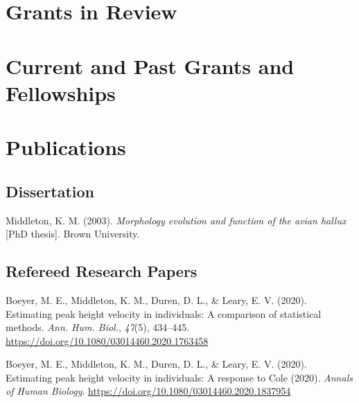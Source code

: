 \documentclass[11pt, a4paper]{awesome-cv}
\begin{document}
\hypertarget{grants-in-review}{%
\section{Grants in Review}\label{grants-in-review}}


\hypertarget{current-and-past-grants-and-fellowships}{%
\section{Current and Past Grants and
Fellowships}\label{current-and-past-grants-and-fellowships}}


\hypertarget{publications}{%
\section{Publications}\label{publications}}

\hypertarget{dissertation}{%
\subsection{Dissertation}\label{dissertation}}

\begingroup
\setlength{\parindent}{-0.5in}
\setlength{\leftskip}{0.5in}

\hypertarget{refs_dissertation}{}
\leavevmode\hypertarget{ref-middleton_morphology_2003}{}%
Middleton, K. M. (2003). \emph{Morphology evolution and function of the
avian hallux} {[}PhD thesis{]}. Brown University.

\endgroup

\hypertarget{refereed-research-papers}{%
\subsection{Refereed Research Papers}\label{refereed-research-papers}}

\begingroup
\setlength{\parindent}{-0.5in}
\setlength{\leftskip}{0.5in}

\hypertarget{refs_papers}{}
\leavevmode\hypertarget{ref-Boeyer2020-jn}{}%
Boeyer, M. E., Middleton, K. M., Duren, D. L., \& Leary, E. V. (2020).
Estimating peak height velocity in individuals: A comparison of
statistical methods. \emph{Ann. Hum. Biol.}, \emph{47}(5), 434--445.
\url{https://doi.org/10.1080/03014460.2020.1763458}

\leavevmode\hypertarget{ref-Boeyer2020-hp}{}%
Boeyer, M. E., Middleton, K. M., Duren, D. L., \& Leary, E. V. (2020).
Estimating peak height velocity in individuals: A response to Cole
(2020). \emph{Annals of Human Biology}.
\url{https://doi.org/10.1080/03014460.2020.1837954}
\end{document}
